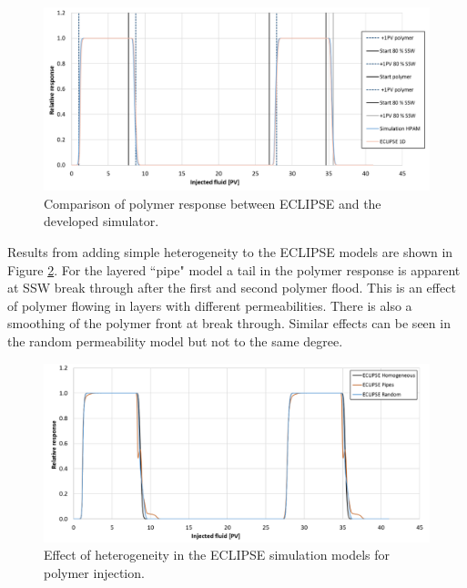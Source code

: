 \documentclass[journal = enfuem, manuscript =  article]{achemso}
\begin{document}
\begin{figure}
    \centering
    \includegraphics[width=\textwidth]{fig/simEcl.png}
    \caption{Comparison of polymer response between ECLIPSE and the developed simulator.}
    \label{cht:simEcl}
\end{figure}

\FloatBarrier

Results from adding simple heterogeneity to the ECLIPSE models are shown in Figure \ref{cht:simEclHet}. For the layered ``pipe" model a tail in the polymer response is apparent at SSW break through after the first and second polymer flood. This is an effect of polymer flowing in layers with different permeabilities. There is also a smoothing of the polymer front at break through. Similar effects can be seen in the random permeability model but not to the same degree.    

\begin{figure}
    \centering
    \includegraphics[width=\textwidth]{fig/simEclHet.png}
    \caption{Effect of heterogeneity in the ECLIPSE simulation models for polymer injection.}
    \label{cht:simEclHet}
\end{figure}
\end{document}

